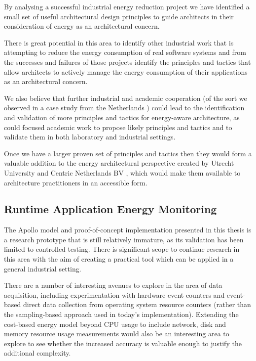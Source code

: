 By analysing a successful industrial energy reduction project we have identified a small set of useful architectural design principles to guide architects in their consideration of energy as an architectural concern.  

There is great potential in this area to identify other industrial work that is attempting to reduce the energy consumption of real software systems and from the successes and failures of those projects identify the principles and tactics that allow architects to actively manage the energy consumption of their applications as an architectural concern.  

We also believe that further industrial and academic cooperation (of the sort we observed in a case study from the Netherlands \cite{jagroep2016-comparingreleases}) could lead to the identification and validation of more principles and tactics for energy-aware architecture, as could focused academic work to propose likely principles and tactics and to validate them in both laboratory and industrial settings.

Once we have a larger proven set of principles and tactics then they would form a valuable addition to the energy architectural perspective created by Utrecht University and Centric Netherlands BV \cite{jagroep2017-energyperspective}, which would make them available to architecture practitioners in an accessible form.

\subsection{Runtime Application Energy Monitoring}

The Apollo model and proof-of-concept implementation presented in this thesis is a research prototype that is still relatively immature, as its validation has been limited to controlled testing.  There is significant scope to continue research in this area with the aim of creating a practical tool which can be applied in a general industrial setting.

There are a number of interesting avenues to explore in the area of data acquisition, including experimentation with hardware event counters and event-based direct data collection from operating system resource counters (rather than the sampling-based approach used in today's implementation).  Extending the cost-based energy model beyond CPU usage to include network, disk and memory resource usage measurements would also be an interesting area to explore to see whether the increased accuracy is valuable enough to justify the additional complexity.

